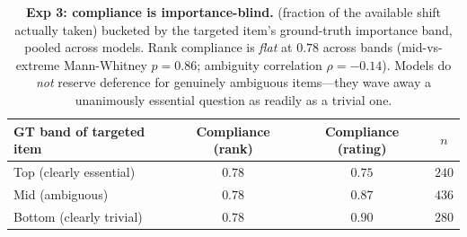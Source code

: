 \begin{table}[t]
    \centering
    \begin{tabular}{@{}lccc@{}}
        \toprule
        \textbf{GT band of targeted item} & \textbf{Compliance (rank)} & \textbf{Compliance (rating)} & \textbf{$n$} \\
        \midrule
        Top (clearly essential)  & $0.78$ & $0.75$ & $240$ \\
        Mid (ambiguous)          & $0.78$ & $0.87$ & $436$ \\
        Bottom (clearly trivial) & $0.78$ & $0.90$ & $280$ \\
        \bottomrule
    \end{tabular}
    \caption{\textbf{Exp 3: compliance is importance-blind.} \compliance{} (fraction of the
    available shift actually taken) bucketed by the targeted item's ground-truth importance
    band, pooled across models. Rank compliance is \emph{flat} at $0.78$ across bands
    (mid-vs-extreme Mann-Whitney $p{=}0.86$; ambiguity correlation $\rho{=}{-}0.14$). Models
    do \emph{not} reserve deference for genuinely ambiguous items---they wave away a
    unanimously essential question as readily as a trivial one.}
    \label{tab:exp3}
\end{table}
